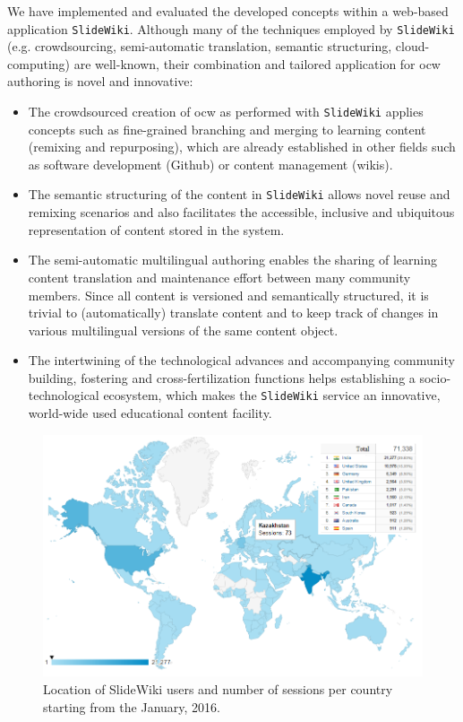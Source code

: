 \documentclass[PhD, Submit, ngerman,UKenglish,table]{scrbook}
\begin{document}
We have implemented and evaluated the developed concepts within a web-based application \texttt{SlideWiki}.
Although many of the techniques employed by \texttt{SlideWiki} (e.g. crowdsourcing, semi-automatic translation, semantic structuring, cloud-computing) are well-known, their combination and tailored application for \gls{ocw} authoring is novel and innovative:
\begin{itemize}
\item The crowdsourced creation of \gls{ocw} as performed with \texttt{SlideWiki} applies concepts such as fine-grained branching and merging to learning content (remixing and repurposing), which are already established in other fields such as software development (Github) or content management (wikis).
\item The semantic structuring of the content in \texttt{SlideWiki} allows novel reuse and remixing scenarios and also facilitates the accessible, inclusive and ubiquitous representation of content stored in the system.
\item The semi-automatic multilingual authoring enables the sharing of learning content translation and maintenance effort between many community members. Since all content is versioned and semantically structured, it is trivial to (automatically) translate content and to keep track of changes in various multilingual versions of the same content object.
\item The intertwining of the technological advances and accompanying community building, fostering and cross-fertilization functions helps establishing a socio-technological ecosystem, which makes the \texttt{SlideWiki} service an innovative, world-wide used educational content facility.
\end{itemize}

\begin{figure}
\centering
\includegraphics[width=\columnwidth]{images/statistics_location.png}
\caption{Location of SlideWiki users and number of sessions per country starting from the January, 2016.}
\label{fig:google_location}
\end{figure}
\end{document}
